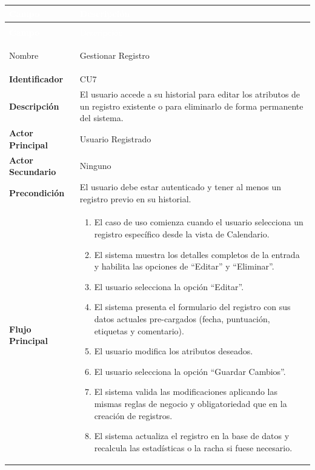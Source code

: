 \begingroup
\small 
\renewcommand{\arraystretch}{1.4}
\begin{xltabular}{\textwidth}{|>{\bfseries}p{3.5cm}|X|}
    \textcolor{white}{Campo} & \textcolor{white}{Descripción} \\ \hline
    \endfirsthead

     \\
    \hline
    \textcolor{white}{Campo} & \textcolor{white}{Descripción} \\ \hline
    \endhead

    Nombre & Gestionar Registro \\ \hline
    Identificador & CU7 \\ \hline
    Descripción & El usuario accede a su historial para editar los atributos de un registro existente o para eliminarlo de forma permanente del sistema. \\ \hline
    Actor Principal & Usuario Registrado \\ \hline
    Actor Secundario & Ninguno \\ \hline
    Precondición & El usuario debe estar autenticado y tener al menos un registro previo en su historial. \\ \hline
    Flujo Principal & 
    \begin{enumerate}[leftmargin=0.5cm, topsep=0pt, partopsep=0pt, parsep=0pt, itemsep=4pt]
        \item El caso de uso comienza cuando el usuario selecciona un registro específico desde la vista de Calendario.
        \item El sistema muestra los detalles completos de la entrada y habilita las opciones de ``Editar'' y ``Eliminar''.
        \item El usuario selecciona la opción ``Editar''.
        \item El sistema presenta el formulario del registro con sus datos actuales pre-cargados (fecha, puntuación, etiquetas y comentario).
        \item El usuario modifica los atributos deseados.
        \item El usuario selecciona la opción ``Guardar Cambios''.
        \item El sistema valida las modificaciones aplicando las mismas reglas de negocio y obligatoriedad que en la creación de registros.
        \item El sistema actualiza el registro en la base de datos y recalcula las estadísticas o la racha si fuese necesario.

\end{enumerate}
\end{xltabular}
